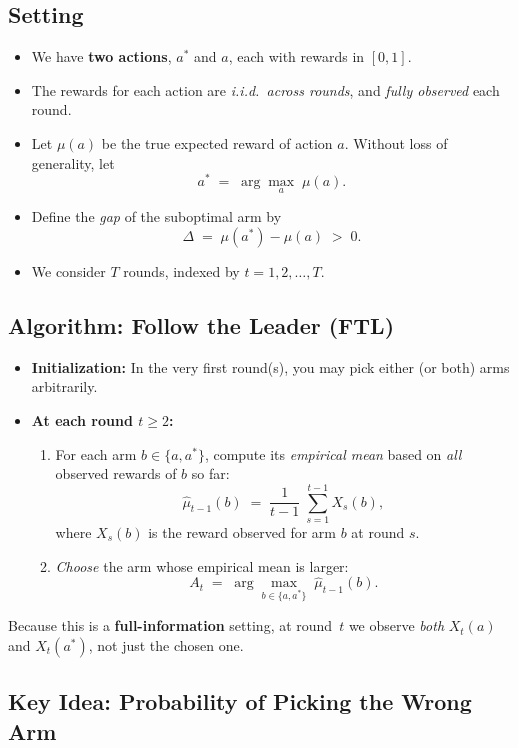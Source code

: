 \subsection*{Setting}

\begin{itemize}
\item We have \textbf{two actions}, $a^*$ and $a$, each with rewards in $[0,1]$.
\item The rewards for each action are \emph{i.i.d.\ across rounds}, and \emph{fully observed} each round.
\item Let $\mu(a)$ be the true expected reward of action $a$.  Without loss of generality, let
\[
  a^* \;=\;\arg\max_{a}\;\mu(a).
\]
\item Define the \emph{gap} of the suboptimal arm by
\[
  \Delta
  \;=\;
  \mu(a^*) - \mu(a)
  \;>\;0.
\]
\item We consider $T$ rounds, indexed by $t=1,2,\dots,T$.
\end{itemize}

\subsection*{Algorithm:\; Follow the Leader (FTL)}

\begin{itemize}
\item \textbf{Initialization:} In the very first round(s), you may pick either (or both) arms arbitrarily.
\item \textbf{At each round $t \ge 2$:}
  \begin{enumerate}
  \item For each arm $b \in \{a,a^*\}$, compute its \emph{empirical mean} based on \emph{all} observed rewards of $b$ so far:
  \[
    \hat{\mu}_{t-1}(b)
    \;=\;
    \frac{1}{t-1}\;\sum_{s=1}^{t-1} X_s(b),
  \]
  where $X_s(b)$ is the reward observed for arm $b$ at round $s$.
  \item \emph{Choose} the arm whose empirical mean is larger:
  \[
    A_t 
    \;=\; 
    \arg\max_{b \in \{a,a^*\}} \;\hat{\mu}_{t-1}(b).
  \]
  \end{enumerate}
\end{itemize}
Because this is a \textbf{full-information} setting, at round~$t$ we observe \emph{both} $X_t(a)$ and $X_t(a^*)$, not just the chosen one.

\subsection*{Key Idea:\; Probability of Picking the Wrong Arm}

